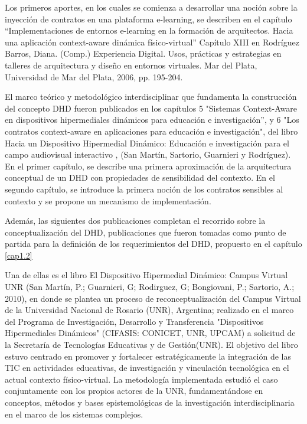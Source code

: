Los primeros aportes, en los cuales se comienza a desarrollar una noción
sobre la inyección de contratos en una plataforma e-learning, se describen en
el capítulo ``Implementaciones de entornos e-learning en la formación de
arquitectos. Hacia una aplicación context-aware dinámica físico-virtual'' Capítulo XIII en Rodríguez Barros, Diana. (Comp.) Experiencia Digital. Usos, prácticas y estrategias en talleres de arquitectura y diseño en entornos virtuales. Mar del
Plata, Universidad de Mar del Plata, 2006, pp. 195-204.

El marco teórico y metodológico interdisciplinar que fundamenta la construcción del concepto DHD fueron publicados en los capítulos 5 "Sistemas Context-Aware en dispositivos hipermediales dinámicos para educación e investigación”, y 6 "Los contratos
context-aware en aplicaciones para educación e investigación", del libro Hacia un Dispositivo Hipermedial Dinámico: Educación e investigación para el campo audiovisual interactivo \cite{librounq}, (San Martín, Sartorio, Guarnieri y Rodríguez). En el primer capítulo, se describe una primera aproximación de la arquitectura conceptual de un DHD con propiedades de sensibilidad del contexto. En el segundo capítulo, se introduce la
primera noción de los contratos sensibles al contexto y se propone un mecanismo
de implementación. 

Además, las siguientes dos publicaciones completan el recorrido sobre la conceptualización del DHD, publicaciones que fueron tomadas como punto de partida para la definición de los requerimientos del DHD, propuesto en el capítulo \ref{cap1.2} 

Una de ellas es el libro El Dispositivo Hipermedial Dinámico: Campus Virtual UNR (San Martín, P.; Guarnieri, G; Rodirguez, G; Bongiovani, P.; Sartorio, A.; 2010), en donde se plantea un proceso de reconceptualización del Campus Virtual de la Universidad Nacional de Rosario (UNR), Argentina; realizado en el marco del Programa de Investigación, Desarrollo y Transferencia "Dispositivos Hipermediales Dinámicos" (CIFASIS: CONICET, UNR, UPCAM) a solicitud de la Secretaría de Tecnologías Educativas y de Gestión(UNR). El objetivo del libro estuvo centrado en promover y fortalecer estratégicamente la integración de las TIC en actividades educativas, de investigación y vinculación tecnológica en el
actual contexto físico-virtual. La metodología implementada estudió el caso
conjuntamente con los propios actores de la UNR, fundamentándose en conceptos,
métodos y bases epistemológicas de la investigación interdisciplinaria en el
marco de los sistemas complejos.

